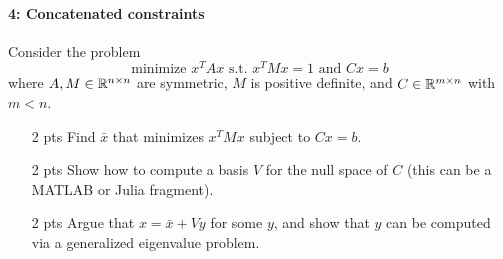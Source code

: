\documentclass[12pt, leqno]{article} %
\begin{document}
\paragraph*{4: Concatenated constraints}
Consider the problem
\[
  \mbox{minimize } x^T A x \mbox{ s.t. } x^T M x = 1 \mbox{ and } Cx = b
\]
where $A, M \in \mathbb{R}^{n \times n}$ are symmetric, $M$ is positive definite, and $C \in
\mathbb{R}^{m \times n}$ with $m < n$.
\begin{itemize}
\item[2 pts] Find $\bar{x}$ that minimizes $x^T M x$ subject to $Cx = b$.
\item[2 pts] Show how to compute a basis $V$ for the null space of $C$
  (this can be a MATLAB or Julia fragment).
\item[2 pts] Argue that $x = \bar{x} + Vy$ for some $y$,
  and show that $y$ can be computed via a generalized eigenvalue problem.
\end{itemize}
\end{document}

